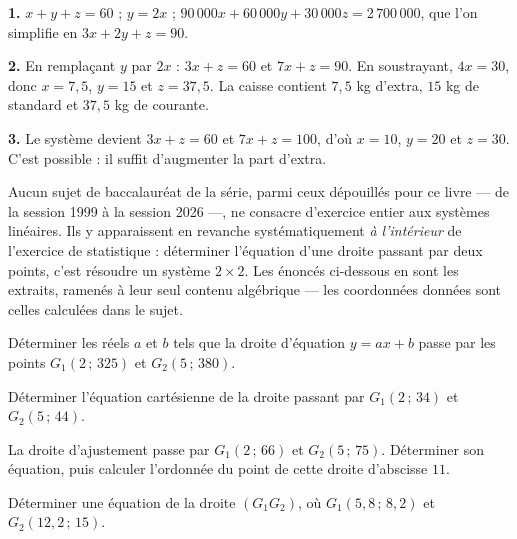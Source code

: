 \begin{corrige}
\textbf{1.} $x+y+z = 60$ ; $y = 2x$ ; $90\,000x+60\,000y+30\,000z
= 2\,700\,000$, que l'on simplifie en $3x+2y+z = 90$.

\textbf{2.} En remplaçant $y$ par $2x$ : $3x+z = 60$ et $7x+z = 90$. En
soustrayant, $4x = 30$, donc $x = 7{,}5$, $y = 15$ et $z = 37{,}5$. La caisse
contient $7{,}5$ kg d'extra, $15$ kg de standard et $37{,}5$ kg de courante.

\textbf{3.} Le système devient $3x+z = 60$ et $7x+z = 100$, d'où $x = 10$,
$y = 20$ et $z = 30$. C'est possible : il suffit d'augmenter la part d'extra.
\end{corrige}

\begin{annales}
Aucun sujet de baccalauréat de la série, parmi ceux dépouillés pour ce livre
— de la session 1999 à la session 2026 —, ne consacre d'exercice entier aux
systèmes linéaires. Ils y apparaissent en revanche systématiquement
\emph{à l'intérieur} de l'exercice de statistique : déterminer l'équation
d'une droite passant par deux points, c'est résoudre un système $2\times2$.
Les énoncés ci-dessous en sont les extraits, ramenés à leur seul contenu
algébrique — les coordonnées données sont celles calculées dans le sujet.

Déterminer les réels $a$ et $b$ tels que la droite d'équation $y = ax+b$
passe par les points $G_{1}(2\,;\,325)$ et $G_{2}(5\,;\,380)$.

Déterminer l'équation cartésienne de la droite passant par
$G_{1}(2\,;\,34)$ et $G_{2}(5\,;\,44)$.

La droite d'ajustement passe par $G_{1}(2\,;\,66)$ et $G_{2}(5\,;\,75)$.
Déterminer son équation, puis calculer l'ordonnée du point de cette droite
d'abscisse $11$.

Déterminer une équation de la droite $(G_{1}G_{2})$, où
$G_{1}(5{,}8\,;\,8{,}2)$ et $G_{2}(12{,}2\,;\,15)$.
\end{annales}

